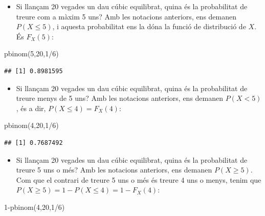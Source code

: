 \documentclass[
]{book}
\newenvironment{Shaded}{\begin{snugshade}}{\end{snugshade}}
\newcommand{\DecValTok}[1]{\textcolor[rgb]{0.00,0.00,0.81}{#1}}
\newcommand{\FunctionTok}[1]{\textcolor[rgb]{0.00,0.00,0.00}{#1}}
\newcommand{\NormalTok}[1]{#1}
\newcommand{\SpecialCharTok}[1]{\textcolor[rgb]{0.00,0.00,0.00}{#1}}
\providecommand{\tightlist}{%
  \setlength{\itemsep}{0pt}\setlength{\parskip}{0pt}}
\renewcommand{\leq}{\leqslant}
\renewcommand{\geq}{\geqslant}
\theoremstyle{definition}
\theoremstyle{definition}
\theoremstyle{definition}
\theoremstyle{remark}
\begin{document}
\begin{itemize}
\tightlist
\item
  Si llançam 20 vegades un dau cúbic equilibrat, quina és la probabilitat de treure com a màxim 5 uns? Amb les notacions anteriors, ens demanen \(P(X\leq 5)\), i aquesta probabilitat ens la dóna la funció de distribució de \(X\). És \(F_X(5)\):
\end{itemize}

\begin{Shaded}
\begin{Highlighting}[]
\FunctionTok{pbinom}\NormalTok{(}\DecValTok{5}\NormalTok{,}\DecValTok{20}\NormalTok{,}\DecValTok{1}\SpecialCharTok{/}\DecValTok{6}\NormalTok{)}
\end{Highlighting}
\end{Shaded}

\begin{verbatim}
## [1] 0.8981595
\end{verbatim}

\begin{itemize}
\tightlist
\item
  Si llançam 20 vegades un dau cúbic equilibrat, quina és la probabilitat de treure menys de 5 uns? Amb les notacions anteriors, ens demanen \(P(X< 5)\), és a dir, \(P(X\leq 4)=F_X(4)\):
\end{itemize}

\begin{Shaded}
\begin{Highlighting}[]
\FunctionTok{pbinom}\NormalTok{(}\DecValTok{4}\NormalTok{,}\DecValTok{20}\NormalTok{,}\DecValTok{1}\SpecialCharTok{/}\DecValTok{6}\NormalTok{)}
\end{Highlighting}
\end{Shaded}

\begin{verbatim}
## [1] 0.7687492
\end{verbatim}

\begin{itemize}
\tightlist
\item
  Si llançam 20 vegades un dau cúbic equilibrat, quina és la probabilitat de treure 5 uns o més? Amb les notacions anteriors, ens demanen \(P(X\geq 5)\). Com que el contrari de treure 5 uns o més és treure 4 uns o menys, tenim que \(P(X\geq 5)=1-P(X\leq 4)=1-F_X(4)\):
\end{itemize}

\begin{Shaded}
\begin{Highlighting}[]
\DecValTok{1}\SpecialCharTok{{-}}\FunctionTok{pbinom}\NormalTok{(}\DecValTok{4}\NormalTok{,}\DecValTok{20}\NormalTok{,}\DecValTok{1}\SpecialCharTok{/}\DecValTok{6}\NormalTok{)}
\end{Highlighting}
\end{Shaded}
\end{document}
